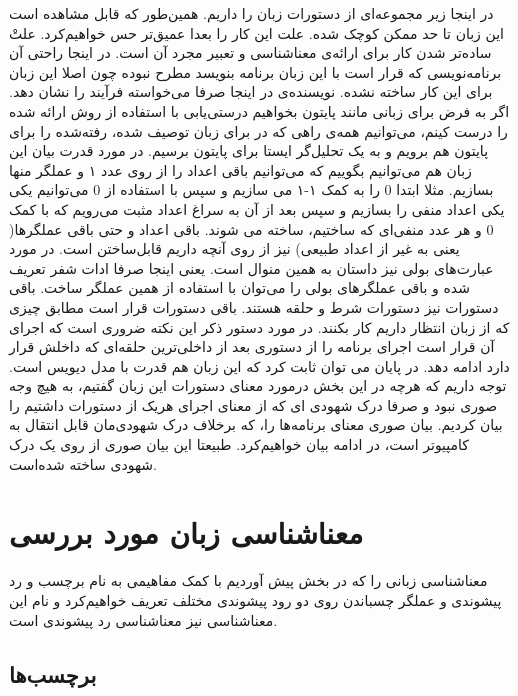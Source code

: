 \vspace{1cm}
در اینجا زیر مجموعه‌ای از دستورات زبان  را داریم. همین‌طور که قابل مشاهده است این زبان تا حد ممکن کوچک شده. علت این کار را بعدا عمیق‌تر حس خواهیم‌کرد. علتْ ساده‌تر شدن کار برای ارائه‌ی معناشناسی و تعبیر مجرد آن است. در اینجا راحتی آن برنامه‌نویسی که قرار است با این زبان برنامه بنویسد مطرح نبوده چون اصلا این زبان برای این کار ساخته نشده. نویسنده‌ی \cite{calcul} در اینجا صرفا می‌خواسته فرآیند را نشان دهد. اگر به فرض برای زبانی مانند پایتون بخواهیم درستی‌یابی با استفاده از روش ارائه شده را درست کینم، می‌توانیم همه‌ی راهی که در \cite{calcul} برای زبان توصیف شده، رفته‌شده را برای پایتون هم برویم و به یک تحلیل‌گر ایستا برای پایتون برسیم.
در مورد قدرت بیان این زبان هم می‌توانیم بگوییم که می‌توانیم باقی اعداد را از روی عدد ۱ و عملگر منها بسازیم. مثلا ابتدا 0 را به کمک ۱-۱ می سازیم و سپس با استفاده از 0 می‌توانیم یکی یکی اعداد منفی را بسازیم و سپس بعد از آن به سراغ اعداد مثبت می‌رویم که با کمک 0 و هر عدد منفی‌ای که ساختیم، ساخته می شوند. باقی اعداد و حتی باقی عملگر‌ها( یعنی به غیر از اعداد طبیعی) نیز از روی آنچه داریم قابل‌ساختن است. در مورد عبارت‌های بولی نیز داستان به همین منوال است. یعنی اینجا صرفا ادات شفر تعریف شده و باقی عملگر‌های بولی را می‌توان با استفاده از همین عملگر ساخت. باقی دستورات نیز دستورات شرط و حلقه هستند. باقی دستورات قرار است مطابق چیزی که از زبان  انتظار داریم کار بکنند. در مورد دستور  ذکر این نکته ضروری است که اجرای آن قرار است اجرای برنامه را از دستوری بعد از داخلی‌ترین حلقه‌ای که  داخلش قرار دارد ادامه ‌دهد. در پایان می توان ثابت کرد که این زبان هم قدرت با مدل دیویس\cite{davis} است. 
توجه داریم که هر‌چه در این بخش در‌مورد معنای دستورات این زبان گفتیم، به هیچ وجه صوری نبود و صرفا درک شهودی ای که از معنای اجرای هر‌یک از دستورات داشتیم را بیان کردیم. بیان صوری معنای برنامه‌ها را، که برخلاف درک شهودی‌مان قابل انتقال به کامپیوتر‌ است، در ادامه بیان خواهیم‌کرد. طبیعتا این بیان صوری از روی یک درک شهودی ساخته شده‌است.

\section{معناشناسی زبان مورد بررسی‬}
معناشناسی زبانی را که در بخش پیش آوردیم با کمک مفاهیمی به نام برچسب و رد پیشوندی و عملگر چسباندن روی دو رود پیشوندی مختلف تعریف خواهیم‌کرد و نام این معناشناسی نیز معناشناسی رد پیشوندی است.\\

\subsection{برچسب‌ها}

